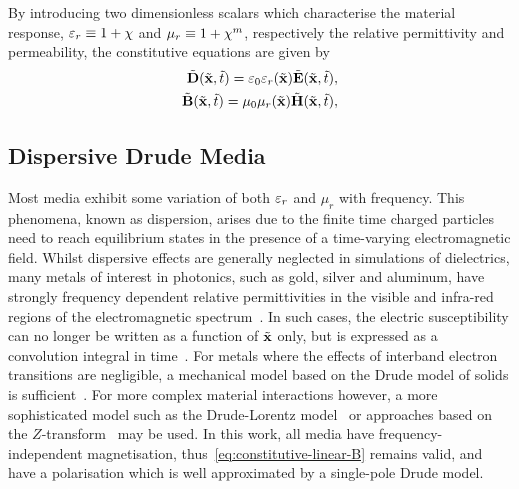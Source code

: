 By introducing two dimensionless scalars which characterise the material response, $\varepsilon_r \equiv 1 + \chi $ and $\mu_r \equiv 1 + \chi^{m} $, respectively the relative permittivity and permeability, the constitutive equations are given by
\begin{subequations}
  \label{eq:constitutive-linear}
  \begin{align}
    \tilde{\mathbf{D}}(\tilde{\mathbf{x}},\tilde{t}) = \varepsilon_0 \varepsilon_r(\tilde{\mathbf{x}}) \tilde{\mathbf{E}}(\tilde{\mathbf{x}},\tilde{t}), \label{eq:constitutive-linear-D} \\
    \tilde{\mathbf{B}}(\tilde{\mathbf{x}},\tilde{t}) = \mu_0 \mu_r(\tilde{\mathbf{x}}) \tilde{\mathbf{H}}(\tilde{\mathbf{x}},\tilde{t}),\label{eq:constitutive-linear-B}
  \end{align}
\end{subequations}

\subsection{Dispersive Drude Media}
Most media exhibit some variation of both $\varepsilon_r$ and $\mu_r$ with frequency. This
phenomena, known as dispersion, arises due to the finite time charged particles
need to reach equilibrium states in the presence of a time-varying electromagnetic field.
Whilst dispersive effects are generally neglected in simulations of dielectrics, many metals of
interest in photonics, such as gold, silver and aluminum, have strongly
frequency dependent relative permittivities in the visible and infra-red regions
of the electromagnetic spectrum~\cite{Ordal:1983bg}. In such cases, the electric susceptibility can no longer be written as a function of
$\tilde{\mathbf{x}}$ only, but is expressed as a convolution integral in time~\cite{Jackson:490457}.
For metals where the effects of interband electron transitions are negligible, a
mechanical model based on the Drude model of solids is
sufficient~\cite{taflove2013advances}. For more complex material interactions
however, a more sophisticated model such as the Drude-Lorentz
model~\cite{Fox:2001wm,Taflove:1989ds} or approaches based on the
$Z$-transform~\cite{sullivan1996z} may be used. In this work, all media have frequency-independent magnetisation, thus~\eqref{eq:constitutive-linear-B} remains valid,
and have a polarisation which is well approximated by a single-pole Drude model.

